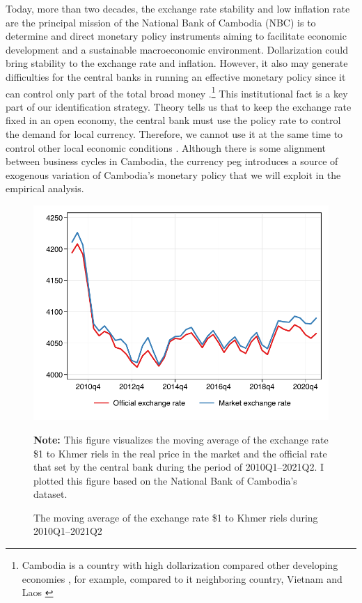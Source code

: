 \documentclass[11pt,letterpaper]{article}
\begin{document}
Today, more than two decades, the exchange rate stability and low inflation rate are the principal mission of the National Bank of Cambodia (NBC) is to determine and direct monetary policy instruments aiming to facilitate economic development and a sustainable macroeconomic environment. Dollarization could bring stability to the exchange rate and inflation. However, it also may generate difficulties for the central banks in running an effective monetary policy since it can control only part of the total broad money \cite{Mohsin1992}.\footnote{Cambodia is a country with high dollarization compared other developing economies \cite{Ra2008}, for example, compared to it neighboring country, Vietnam and Laos \cite{Khou2013}} This institutional fact is a key part of our identification strategy. Theory tells us that to keep the exchange rate fixed in an open economy, the central bank must use the policy rate to control the demand for local currency. Therefore, we cannot use it at the same time to control other local economic conditions \cite{Fleming1962, Mundell1963}. Although there is some alignment between business cycles in Cambodia, the currency peg introduces a source of exogenous variation of Cambodia's monetary policy that we will exploit in the empirical analysis. 
\begin{figure}[H]
	\centering
	\caption{ The moving average of the exchange rate \$1 to Khmer riels during 2010Q1--2021Q2}
	\label{fig:1}
	\includegraphics[width=0.7\linewidth]{../../empirical/Marcodata/Graphs/moving_exrate}
	\vspace{-1em}
	\begin{tablenotes}
		\footnotesize
		\item \textbf{Note:} This figure visualizes the moving average of the exchange rate \$1 to Khmer riels in the real price in the market and the official rate that set by the central bank during the period of 2010Q1--2021Q2. I plotted this figure based on the National Bank of Cambodia's dataset. 
	\end{tablenotes} 
	
\end{figure}
\end{document}
